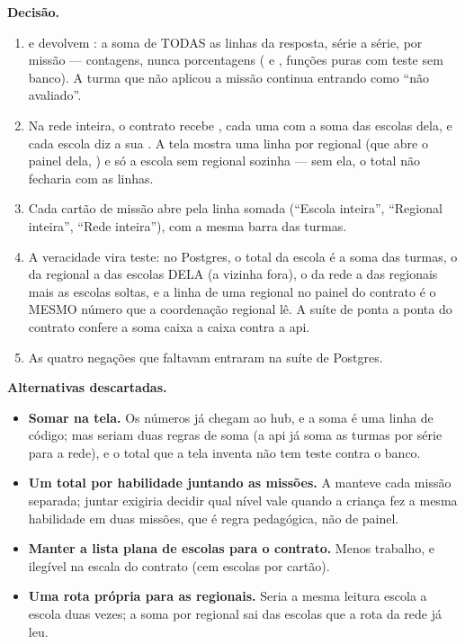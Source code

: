 \textbf{Decisão.}
\begin{enumerate}
  \item {} e
     devolvem : a soma de
    TODAS as linhas da resposta, série a série, por missão --- contagens, nunca
    porcentagens ( e , funções puras com
    teste sem banco). A turma que não aplicou a missão continua entrando como
    \enquote{não avaliado}.
  \item Na rede inteira, o contrato recebe , cada uma com a soma
    das escolas dela, e cada escola diz a sua . A tela mostra
    uma linha por regional (que abre o painel dela, ) e só a
    escola sem regional sozinha --- sem ela, o total não fecharia com as linhas.
  \item Cada cartão de missão abre pela linha somada (\enquote{Escola inteira},
    \enquote{Regional inteira}, \enquote{Rede inteira}), com a mesma barra das
    turmas.
  \item A veracidade vira teste: no Postgres, o total da escola é a soma das
    turmas, o da regional a das escolas DELA (a vizinha fora), o da rede a das
    regionais mais as escolas soltas, e a linha de uma regional no painel do
    contrato é o MESMO número que a coordenação regional lê. A suíte de ponta a
    ponta do contrato confere a soma caixa a caixa contra a api.
  \item As quatro negações que faltavam entraram na suíte de Postgres.
\end{enumerate}

\textbf{Alternativas descartadas.}
\begin{itemize}
  \item \textbf{Somar na tela.} Os números já chegam ao hub, e a soma é uma
    linha de código; mas seriam duas regras de soma (a api já soma as turmas
    por série para a rede), e o total que a tela inventa não tem teste contra o
    banco.
  \item \textbf{Um total por habilidade juntando as missões.} A
     manteve cada missão separada; juntar exigiria decidir qual
    nível vale quando a criança fez a mesma habilidade em duas missões, que é
    regra pedagógica, não de painel.
  \item \textbf{Manter a lista plana de escolas para o contrato.} Menos
    trabalho, e ilegível na escala do contrato (cem escolas por cartão).
  \item \textbf{Uma rota própria para as regionais.} Seria a mesma leitura
    escola a escola duas vezes; a soma por regional sai das escolas que a rota
    da rede já leu.
\end{itemize}

